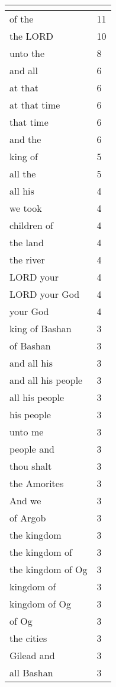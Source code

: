 \begin{center}
\begin{longtable}{|p{3.0in}|p{0.5in}|}
\hline \multicolumn{2}{c}{{ }} \\ \hline
\endfoot 
of the & 11\\ \hline 
the LORD & 10\\ \hline 
unto the & 8\\ \hline 
and all & 6\\ \hline 
at that & 6\\ \hline 
at that time & 6\\ \hline 
that time & 6\\ \hline 
and the & 6\\ \hline 
king of & 5\\ \hline 
all the & 5\\ \hline 
all his & 4\\ \hline 
we took & 4\\ \hline 
children of & 4\\ \hline 
the land & 4\\ \hline 
the river & 4\\ \hline 
LORD your & 4\\ \hline 
LORD your God & 4\\ \hline 
your God & 4\\ \hline 
king of Bashan & 3\\ \hline 
of Bashan & 3\\ \hline 
and all his & 3\\ \hline 
and all his people & 3\\ \hline 
all his people & 3\\ \hline 
his people & 3\\ \hline 
unto me & 3\\ \hline 
people and & 3\\ \hline 
thou shalt & 3\\ \hline 
the Amorites & 3\\ \hline 
And we & 3\\ \hline 
of Argob & 3\\ \hline 
the kingdom & 3\\ \hline 
the kingdom of & 3\\ \hline 
the kingdom of Og & 3\\ \hline 
kingdom of & 3\\ \hline 
kingdom of Og & 3\\ \hline 
of Og & 3\\ \hline 
the cities & 3\\ \hline 
Gilead and & 3\\ \hline 
all Bashan & 3\\ \hline 

\end{longtable}
\end{center}
